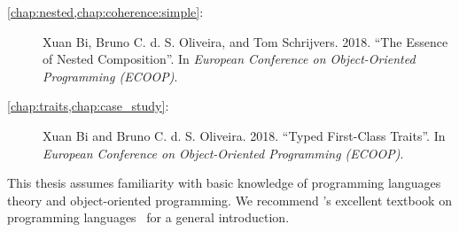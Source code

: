 \begin{description}
\item[\cref{chap:nested,chap:coherence:simple}:] Xuan Bi, Bruno C. d. S.
  Oliveira, and Tom Schrijvers. 2018. ``The Essence of Nested Composition''. In
  \textit{European Conference on Object-Oriented Programming (ECOOP)}.
\item[\cref{chap:traits,chap:case_study}:] Xuan Bi and Bruno C. d. S. Oliveira.
  2018. ``Typed First-Class Traits''. In \textit{European Conference on Object-Oriented Programming (ECOOP)}.
\end{description}

\noindent\makebox[\linewidth]{\rule{0.7\textwidth}{0.4pt}}

\vspace{1.5\baselineskip}

This thesis assumes familiarity with basic knowledge of programming languages
theory and object-oriented programming. We recommend
\citeauthor{DBLP:books/daglib/0005958}'s excellent textbook on programming
languages~\citep{DBLP:books/daglib/0005958} for a general introduction.


